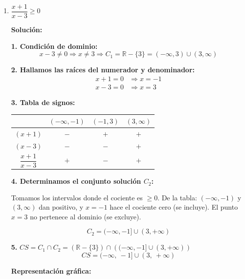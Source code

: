 \documentclass[12pt]{article}
\newcommand{\solucion}{%
    \vspace{0.8em}%
    \textbf{Solución:}%
}
\begin{document}
\begin{enumerate}[label=\alph*.-]

    \item $\dfrac{x+1}{x-3} \geq 0$

    \solucion

    \textbf{1. Condición de dominio:}
    \[
    x - 3 \neq 0 \Rightarrow x \neq 3 \Rightarrow C_1 = \mathbb{R} - \{3\} = (-\infty, 3) \cup (3, \infty)
    \]

    \textbf{2. Hallamos las raíces del numerador y denominador:}
    \begin{align*}
    x + 1 = 0 &\Rightarrow x = -1 \\
    x - 3 = 0 &\Rightarrow x = 3
    \end{align*}

    \textbf{3. Tabla de signos:}

    \begin{center}
    \begin{tabular}{|c|c|c|c|}
    \hline
    & $(-\infty, -1)$ & $(-1, 3)$ & $(3, \infty)$ \\
    \hline
    $(x+1)$ & $-$ & $+$ & $+$ \\
    \hline
    $(x-3)$ & $-$ & $-$ & $+$ \\
    \hline
    $\dfrac{x+1}{x-3}$ & $+$ & $-$ & $+$ \\
    \hline
    \end{tabular}
    \end{center}

    \textbf{4. Determinamos el conjunto solución $C_2$:}

    Tomamos los intervalos donde el cociente es $\geq 0$. De la tabla: $(-\infty, -1)$ y $(3, \infty)$ dan positivo, y $x = -1$ hace el cociente cero (se incluye). El punto $x = 3$ no pertenece al dominio (se excluye).

    \[
    C_2 = (-\infty, -1] \cup (3, +\infty)
    \]

    \textbf{5.} $CS = C_1 \cap C_2 = (\mathbb{R} - \{3\}) \cap \left((-\infty, -1] \cup (3, +\infty)\right)$
    \[
    \boxed{CS = (-\infty,\ -1] \cup (3,\ +\infty)}
    \]

    \textbf{Representación gráfica:}

    \begin{center}
\end{center}
\end{enumerate}
\end{document}
